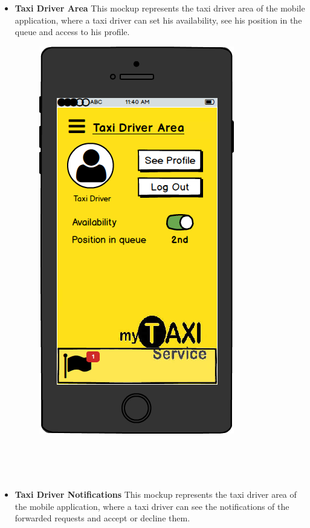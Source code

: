 \documentclass[18pt,oneside,a4paper, titlepage]{article}
\begin{document}
\begin{itemize}
\begin{figure}[h]
				\end{figure}
				\\ \\ \\
				\item \textbf{Taxi Driver Area} This mockup represents the taxi driver area of the mobile application, where a taxi driver can set his availability, see his position in the queue and access to his profile.\\
				\begin{figure}[h]
					\centering
					\includegraphics[scale=0.3]{Mockups/MobileAppTaxiDriverArea.png}
				\end{figure}
				\\
				\\ \\ 
				\item \textbf{Taxi Driver Notifications} This mockup represents the taxi driver area of the mobile application, where a taxi driver can see the notifications of the forwarded requests and accept or decline them.\\

\end{itemize}
\end{document}
